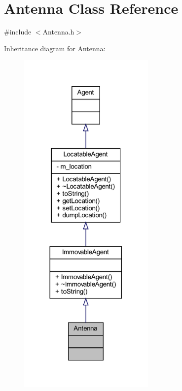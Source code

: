 \hypertarget{class_antenna}{}\section{Antenna Class Reference}
\label{class_antenna}


{\ttfamily \#include $<$Antenna.\+h$>$}



Inheritance diagram for Antenna\+:\nopagebreak
\begin{figure}[H]
\begin{center}
\leavevmode
\includegraphics[width=189pt]{class_antenna__inherit__graph}
\end{center}
\end{figure}


